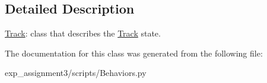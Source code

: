 \subsection{Detailed Description}
\hyperlink{classBehaviors_1_1Track}{Track}\+: class that describes the \hyperlink{classBehaviors_1_1Track}{Track} state. 

The documentation for this class was generated from the following file\+:\begin{DoxyCompactItemize}
\item 
exp\+\_\+assignment3/scripts/Behaviors.\+py\end{DoxyCompactItemize}

